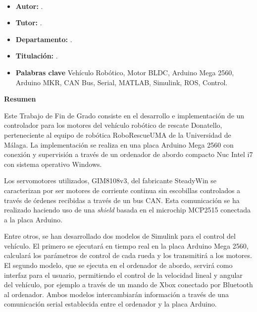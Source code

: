 
\begin{center}
    {\fontsize{20}{30}\selectfont \textbf{\tfgTitle}\\}
\end{center}
\bigskip

\begin{itemize}
    \item \large \textbf{Autor:} \tfgAuthor.
    \item \large \textbf{Tutor:} \tfgTutor.
    \item \large \textbf{Departamento:} \tfgDepartment.
    \item \large \textbf{Titulación:} \tfgGrade.
    \item \large \textbf{Palabras clave} Vehículo Robótico, Motor BLDC, Arduino Mega 2560, Arduino MKR, CAN Bus, Serial, MATLAB, Simulink, ROS, Control.
\end{itemize}
\begin{center}
    {\fontsize{15}{40}\selectfont \textbf{Resumen}\\}
\end{center}
\bigskip

Este Trabajo de Fin de Grado consiste en el desarrollo e implementación de un controlador para los motores del vehículo robótico de rescate Donatello, perteneciente al equipo de robótica RoboRescueUMA de la Universidad de Málaga. La implementación se realiza en una placa Arduino Mega 2560 con conexión y supervisión a través de un ordenador de abordo compacto Nuc Intel i7 con sistema operativo Windows. 

Los servomotores utilizados, GIM8108v3, del fabricante SteadyWin se caracterizan por ser motores de corriente continua sin escobillas controlados a través de órdenes recibidas a través de un bus CAN. Esta comunicación se ha realizado haciendo uso de una \textit{shield} basada en el microchip MCP2515 conectada a la placa Arduino.

Entre otros, se han desarrollado dos modelos de Simulink para el control del vehículo. El primero se ejecutará en tiempo real en la placa Arduino Mega 2560, calculará los parámetros de control de cada rueda y los transmitirá a los motores.  El segundo modelo, que se ejecuta en el ordenador de abordo, servirá como interfaz para el usuario, permitiendo el control de la velocidad lineal y angular del vehículo, por ejemplo a través de un mando de Xbox conectado por Bluetooth al ordenador. Ambos modelos intercambiarán información a través de una comunicación serial establecida entre el ordenador y la placa Arduino.

